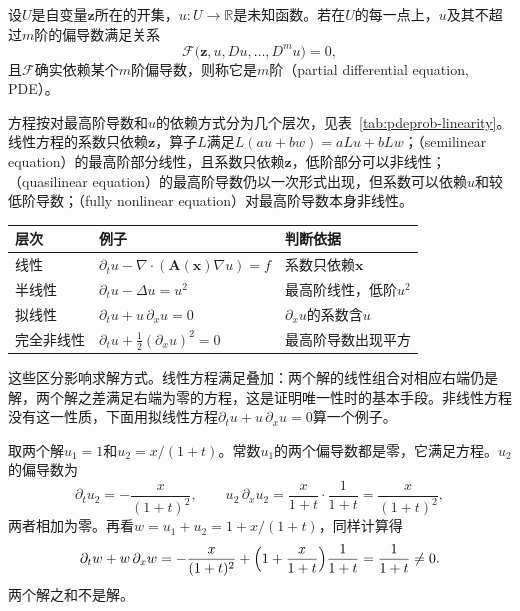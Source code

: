 \begin{definition}[偏微分方程]
\label{def:pdeprob-pde}
设$U$是自变量$\bm{z}$所在的开集，$u:U\to\mathbb{R}$是未知函数。若在$U$的每一点上，$u$及其不超过$m$阶的偏导数满足关系
\begin{equation}
  \mathcal{F}\bigl(\bm{z},u,Du,\ldots,D^{m}u\bigr)=0,
  \label{eq:pdeprob-general-form}
\end{equation}
且$\mathcal{F}$确实依赖某个$m$阶偏导数，则称它是$m$阶（partial differential equation, PDE）。
\end{definition}

方程按对最高阶导数和$u$的依赖方式分为几个层次，见表~\ref{tab:pdeprob-linearity}。线性方程的系数只依赖$\bm{z}$，算子$L$满足$L(au+bw)=aLu+bLw$；（semilinear equation）的最高阶部分线性，且系数只依赖$\bm{z}$，低阶部分可以非线性；（quasilinear equation）的最高阶导数仍以一次形式出现，但系数可以依赖$u$和较低阶导数；（fully nonlinear equation）对最高阶导数本身非线性。

\begin{BookInlineTable}
  \centering
  \begin{tabular}{lll}
    \toprule
    层次 & 例子 & 判断依据\\
    \midrule
    线性 & $\partial_tu-\nabla\cdot(\bm{A}(\bm{x})\nabla u)=f$ & 系数只依赖$\bm{x}$\\
    半线性 & $\partial_tu-\Delta u=u^{2}$ & 最高阶线性，低阶$u^{2}$\\
    拟线性 & $\partial_tu+u\,\partial_xu=0$ & $\partial_xu$的系数含$u$\\
    完全非线性 & $\partial_tu+\frac12(\partial_xu)^{2}=0$ & 最高阶导数出现平方\\
    \bottomrule
  \end{tabular}
  \caption{偏微分方程按线性程度的层次。}
  \label{tab:pdeprob-linearity}
\end{BookInlineTable}

这些区分影响求解方式。线性方程满足叠加：两个解的线性组合对相应右端仍是解，两个解之差满足右端为零的方程，这是证明唯一性时的基本手段。非线性方程没有这一性质，下面用拟线性方程$\partial_tu+u\,\partial_xu=0$算一个例子。

取两个解$u_1=1$和$u_2=x/(1+t)$。常数$u_1$的两个偏导数都是零，它满足方程。$u_2$的偏导数为
\[
  \partial_tu_2=-\frac{x}{(1+t)^{2}},\qquad
  u_2\,\partial_xu_2=\frac{x}{1+t}\cdot\frac{1}{1+t}=\frac{x}{(1+t)^{2}},
\]
两者相加为零。再看$w=u_1+u_2=1+x/(1+t)$，同样计算得
\[
  \partial_tw+w\,\partial_xw=-\frac{x}{(1+t)^{2}}+\Bigl(1+\frac{x}{1+t}\Bigr)\frac{1}{1+t}=\frac{1}{1+t}\neq0.
\]
两个解之和不是解。

